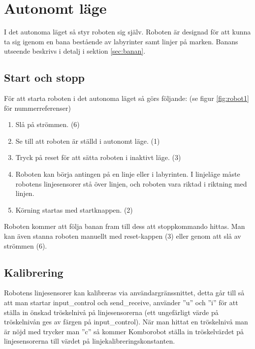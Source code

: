 
%
%

\section{Autonomt läge}
I det autonoma läget så styr roboten sig själv. Roboten är designad för att kunna ta sig igenom en bana bestående av labyrinter samt linjer på marken. Banans utseende beskrivs i detalj i sektion \ref{sec:banan}.

\subsection{Start och stopp}
För att starta roboten i det autonoma läget så görs följande: (se figur \ref{fig:robot1} för nummerreferenser)

\begin{enumerate}
\item Slå på strömmen. (6)
\item Se till att roboten är ställd i autonomt läge. (1)
\item Tryck på reset för att sätta roboten i inaktivt läge. (3)
\item Roboten kan börja antingen på en linje eller i labyrinten. I linjeläge måste robotens linjesensorer stå över linjen, och roboten vara riktad i riktning med linjen. 
\item Körning startas med startknappen. (2)
\end{enumerate}

Roboten kommer att följa banan fram till dess att stoppkommando hittas. Man kan även stanna roboten manuellt med reset-kappen (3) eller genom att slå av strömmen (6). 

\subsection{Kalibrering}
Robotens linjesensorer kan kalibreras via användargränssnittet, detta går till
så att man startar input\_control och send\_receive, använder ''u'' och ''i''
för att ställa in önskad tröskelnivå på linjesensorerna (ett ungefärligt värde
på tröskelnivån ges av färgen på input\_control). När man hittat en tröskelnivå
man är nöjd med trycker man ''c'' så kommer Komborobot ställa in tröskelvärdet
på linjesensorerna till värdet på linjekalibreringskonstanten.


